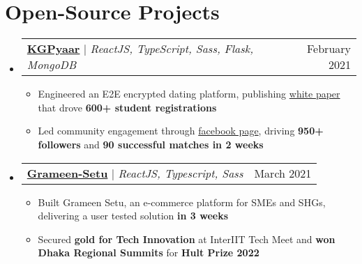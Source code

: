 \documentclass[letterpaper,11pt]{article}
\makeatletter
\newcommand{\resumeItem}[1]{
  \item\small{
    {#1 \vspace{-2pt}}
  }
}
\newcommand{\resumeProjectHeading}[2]{
    \item
    \begin{tabular*}{0.97\textwidth}{l@{\extracolsep{\fill}}r}
      \small#1 & \small #2\\
    \end{tabular*}\vspace{-7pt}
}
\newcommand{\resumeSubHeadingListStart}{\begin{itemize}[leftmargin=0.0in, label={}]}
\newcommand{\resumeSubHeadingListEnd}{\end{itemize}}
\newcommand{\resumeItemListStart}{\begin{itemize}}
\newcommand{\resumeItemListEnd}{\end{itemize}\vspace{-5pt}}
\makeatother
\begin{document}
\section{Open-Source Projects}
%
\resumeSubHeadingListStart
\resumeProjectHeading
{\textbf{\href{https://github.com/kgpyaar-tech?tab=repositories}{KGPyaar}} $|$ \emph{ReactJS, TypeScript, Sass, Flask, MongoDB}}{February 2021}
\resumeItemListStart
\resumeItem{Engineered an E2E encrypted dating platform, publishing \href{https://bit.ly/KGPyaar-Doc}{white paper} that drove \textbf{600+ student registrations}}
\resumeItem{Led community engagement through \href{https://www.facebook.com/KGPyaar}{facebook page}, driving \textbf{950+ followers} and \textbf{90 successful matches in 2 weeks}}
\resumeItemListEnd
\resumeProjectHeading
{\textbf{\href{https://github.com/InterEyeEyeTea2021/frontend}{Grameen-Setu}} $|$ \emph{ReactJS, Typescript, Sass}}{March 2021}
\resumeItemListStart
\resumeItem{Built Grameen Setu, an e-commerce platform for SMEs and SHGs, delivering a user tested solution \textbf{in 3 weeks}}
\resumeItem{Secured \textbf{gold for Tech Innovation} at InterIIT Tech Meet and \textbf{won Dhaka Regional Summits} for \textbf{Hult Prize 2022}}
\resumeItemListEnd
\resumeSubHeadingListEnd
%
\end{document}
